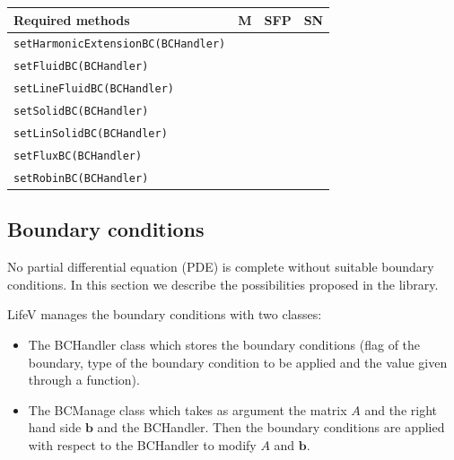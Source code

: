 \documentclass[11pt]{article}
\newcommand{\tick}{\ding{51}}
\begin{document}
\begin{center}
\begin{longtable}{l|c|c|c|}
	Required methods & M & SFP & SN\\
	\hline
	\texttt{setHarmonicExtensionBC(BCHandler)} & \tick & \tick & \tick \\
	\texttt{setFluidBC(BCHandler)} & \tick & \tick & \tick \\
	\texttt{setLineFluidBC(BCHandler)} & & & \tick \\
	\texttt{setSolidBC(BCHandler)} & \tick & \tick & \tick \\
	\texttt{setLinSolidBC(BCHandler)} & & & \tick \\
	\texttt{setFluxBC(BCHandler)} & \tick & &\\
	\texttt{setRobinBC(BCHandler)} & \tick & &
\end{longtable}
\end{center}

\subsection{Boundary conditions}
\label{sec:BC}
No partial differential equation (PDE) is complete without suitable boundary conditions. In this section we describe the possibilities proposed in the library.

LifeV manages the boundary conditions with two classes:
\begin{itemize}
\item The BCHandler class which stores the boundary conditions (flag of the boundary, type of the boundary condition to be applied and the value given through a function).
\item The BCManage class which takes as argument the matrix $A$ and the right hand side $\mathbf{b}$ and the BCHandler. Then the boundary conditions are applied with respect to the BCHandler to modify $A$ and $\mathbf{b}$.
\end{itemize}
\end{document}
